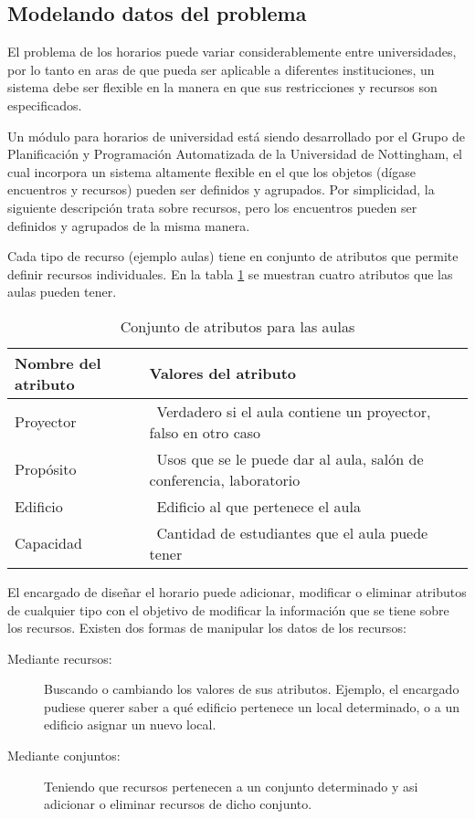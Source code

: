 \subsection{Modelando datos del problema}

El problema de los horarios puede variar considerablemente entre universidades, por lo tanto en aras de que pueda ser aplicable a diferentes instituciones, un sistema debe ser flexible en la manera en que sus restricciones y recursos son especificados.

Un módulo para horarios de universidad está siendo desarrollado por el Grupo de Planificación y Programación Automatizada de la Universidad de Nottingham, el cual incorpora un sistema altamente flexible en el que los objetos (dígase encuentros y recursos) pueden ser definidos y agrupados. Por simplicidad, la siguiente descripción trata sobre recursos, pero los encuentros pueden ser definidos y agrupados de la misma manera.

Cada tipo de recurso (ejemplo aulas) tiene en conjunto de atributos que permite definir recursos individuales. En la tabla \ref{table:atributes} se muestran cuatro atributos que las aulas pueden tener.

\begin{table}
	\caption{Conjunto de atributos para las aulas}
	\begin{center}
		\label{table:atributes}
		\begin{tabular}{lp{7.5cm}r}
			Nombre del atributo & Valores del atributo \\ \hline
			Proyector &\ Verdadero si el aula contiene un proyector, falso en otro caso \\
			Propósito &\ Usos que se le puede dar al aula, salón de conferencia, laboratorio \\
			Edificio &\ Edificio al que pertenece el aula \\
			Capacidad &\ Cantidad de estudiantes que el aula puede tener
		\end{tabular}
	\end{center}
\end{table}

El encargado de diseñar el horario puede adicionar, modificar o eliminar atributos de cualquier tipo con el objetivo de modificar la información que se tiene sobre los recursos. Existen dos formas de manipular los datos de los recursos:

\begin{description}
	\item[Mediante recursos:] Buscando o cambiando los valores de sus atributos. Ejemplo, el encargado pudiese querer saber a qu\'e edificio pertenece un local determinado, o a un edificio asignar un nuevo local.
	\item[Mediante conjuntos:] Teniendo que recursos pertenecen a un conjunto determinado y asi adicionar o eliminar recursos de dicho conjunto.
\end{description}

